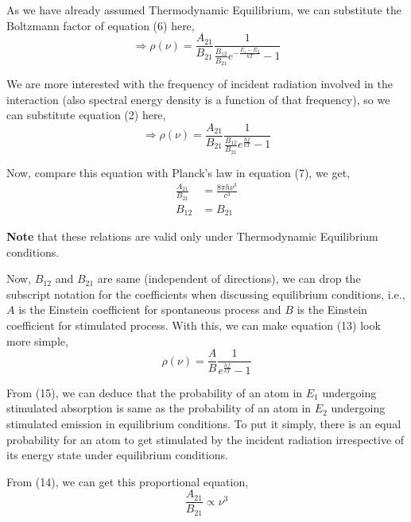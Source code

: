 \documentclass[12pt]{article}
\begin{document}
As we have already assumed Thermodynamic Equilibrium, we can substitute the Boltzmann factor of equation (6) here,
\begin{equation*}
    \Rightarrow \rho(\nu) = \frac{A_{21}}{B_{21}} \frac{1}{\frac{B_{12}}{B_{21}} e^{-\frac{E_{1} - E_{2}}{kT}} - 1}
\end{equation*} \vspace{.2cm}

We are more interested with the frequency of incident radiation involved in the interaction (also spectral energy density is a function of that frequency), so we can substitute equation (2) here,
\begin{equation}
    \Rightarrow \rho(\nu) = \frac{A_{21}}{B_{21}} \frac{1}{\frac{B_{12}}{B_{21}} e^{\frac{hf}{kT}} - 1}
\end{equation}

Now, compare this equation with Planck's law in equation (7), we get,
\begin{align}
    \frac{A_{21}}{B_{21}} & = \frac{8\pi h \nu^3}{c^3} \\
    B_{12} & = B_{21}
\end{align}

\textbf{Note} that these relations are valid only under Thermodynamic Equilibrium conditions. \vspace{.2cm}

Now, $B_{12}$ and $B_{21}$ are same (independent of directions), we can drop the subscript notation for the coefficients when discussing equilibrium conditions, i.e., $A$ is the Einstein coefficient for spontaneous process and $B$ is the Einstein coefficient for stimulated process. With this, we can make equation (13) look more simple,
\begin{equation*}
    \rho(\nu) = \frac{A}{B} \frac{1}{e^{\frac{hf}{kT}} - 1}
\end{equation*} 

From (15), we can deduce that the probability of an atom in $E_{1}$ undergoing stimulated absorption is same as the probability of an atom in $E_{2}$ undergoing stimulated emission in equilibrium conditions. To put it simply, there is an equal probability for an atom to get stimulated by the incident radiation irrespective of its energy state under equilibrium conditions. \vspace{.2cm} 

From (14), we can get this proportional equation,
\begin{equation*}
    \frac{A_{21}}{B_{21}} \propto \nu^{3}
\end{equation*}
\end{document}
